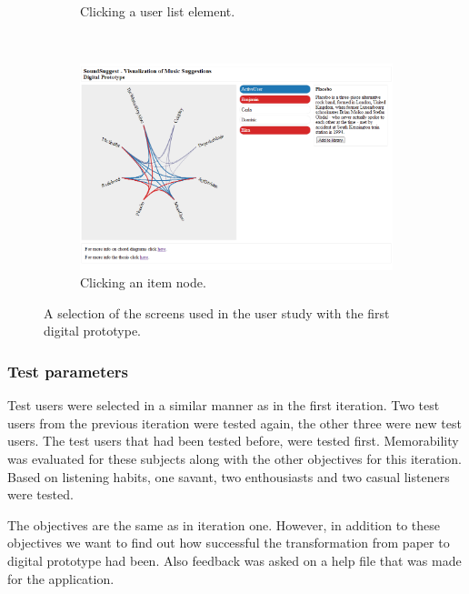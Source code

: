 \begin{figure}
\begin{subfigure}[t]{0.3\textwidth}
					\caption{Clicking a user list element.}
					\label{figure:prototype_soundsuggest1_user_click}
	\end{subfigure}
	~
	\begin{subfigure}[t]{0.3\textwidth}
					\centering
					\includegraphics[width=\textwidth]{img/prototype_soundsuggest1_item_click}
					\caption{Clicking an item node.}
					\label{figure:prototype_soundsuggest1_item_click}
	\end{subfigure}
	\caption{A selection of the screens used in the user study with the first digital prototype.}%
	\label{figure:prototype_soundsuggest1}%
\end{figure}



\subsubsection{Test parameters}\label{chapter:prototype:section:soundsuggest1:setup}

Test users were selected in a similar manner as in the first iteration. Two test users from the previous iteration were tested again, the other three were new test users. The test users that had been tested before, were tested first. Memorability was evaluated for these subjects along with the other objectives for this iteration. Based on listening habits, one savant, two enthousiasts and two casual listeners were tested.

The objectives are the same as in iteration one. However, in addition to these objectives we want to find out how successful the transformation from paper to digital prototype had been. Also feedback was asked on a help file that was made for the application.

